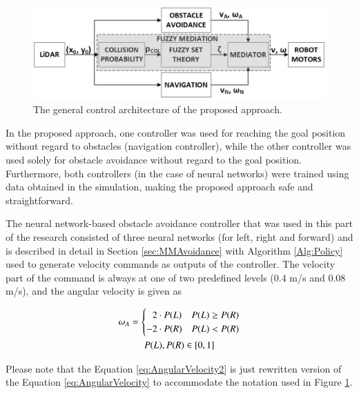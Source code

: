 \begin{figure}
\centering
\includegraphics[width=0.95\columnwidth]{slike/Fig03_11.png}
\caption{The general control architecture of the proposed approach.} 
\label{Fig:Blok}
\end{figure}

In the proposed approach, one controller was used for reaching the goal position without regard to obstacles (navigation controller), while the other controller was used solely for obstacle avoidance without regard to the goal position. Furthermore, both controllers (in the case of neural networks) were trained using data obtained in the simulation, making the proposed approach safe and straightforward. 

The neural network-based obstacle avoidance controller that was used in this part of the research consisted of three neural networks (for left, right and forward) and is described in detail in Section \ref{sec:MMAvoidance} with Algorithm \ref{Alg:Policy} used to generate velocity commands as outputs of the controller. The velocity part of the command is always at one of two predefined levels (0.4 m/s and 0.08 m/s), and the angular velocity is given as

\begin{gather}
    \label{eq:AngularVelocity2}
    \omega_A = \begin{cases}
        \hphantom{-}2 \cdot P(L) & P(L) \geq P(R)\\
        -2 \cdot  P(R) & P(L) < P(R)
    \end{cases}\\
    P(L), P(R) \in [0,1] \nonumber
\end{gather}

Please note that the Equation \ref{eq:AngularVelocity2} is just rewritten version of the Equation \ref{eq:AngularVelocity} to accommodate the notation used in Figure \ref{Fig:Blok}.

